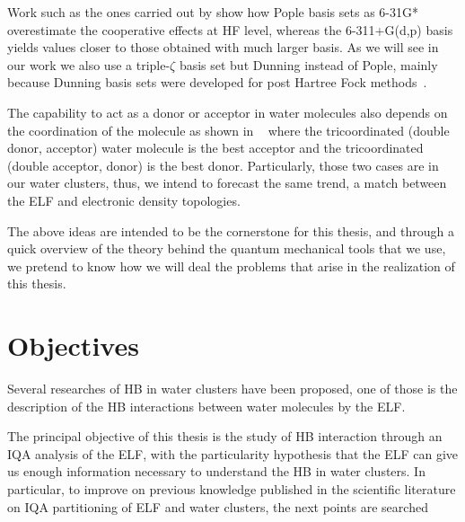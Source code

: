 
Work such as the ones carried out by \citet{M1992} show how Pople basis sets as
6-31G* overestimate the cooperative effects at HF level, whereas the
6-311+G(d,p) basis yields values closer to those obtained with much larger
basis.  As we will see in our work we also use a triple-$\zeta$ basis set but
Dunning instead of Pople, mainly because Dunning basis sets were developed for
post Hartree Fock methods~\cite{Dunning1989}.

The capability to act as a donor or acceptor in water molecules also depends on
the coordination of the molecule as shown in ~\citet{Toche2016, Castor2020}
where the tricoordinated (double donor, acceptor) water molecule is the best
acceptor and the tricoordinated (double acceptor, donor) is the best donor.
Particularly, those two cases are in our water clusters, thus, we intend to
forecast the same trend, a match between the ELF and electronic density topologies.

The above ideas are intended to be the cornerstone for this thesis, and through
a quick overview of the theory behind the quantum mechanical tools that we use,
we pretend to know how we will deal the problems that arise in
the realization of this thesis.

\chapter{Objectives}

Several researches of HB in water clusters have been proposed, one of those is
the description of the HB interactions between water molecules by the
\gls{ELF}.

The principal objective of this thesis is the study of HB interaction through
an IQA analysis of the ELF, with the particularity hypothesis that the ELF can give us
enough information necessary to understand the HB in water clusters. In particular,
to improve on previous knowledge published in the scientific literature on IQA partitioning of ELF and water clusters,
the next points are searched

